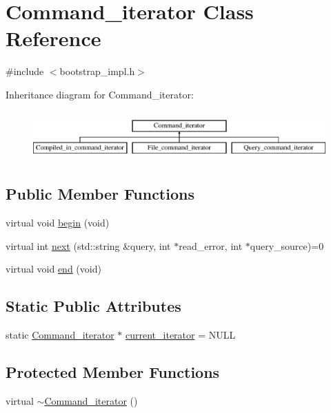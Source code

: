 \hypertarget{classCommand__iterator}{}\section{Command\+\_\+iterator Class Reference}
\label{classCommand__iterator}


{\ttfamily \#include $<$bootstrap\+\_\+impl.\+h$>$}

Inheritance diagram for Command\+\_\+iterator\+:\begin{figure}[H]
\begin{center}
\leavevmode
\includegraphics[height=1.904762cm]{classCommand__iterator}
\end{center}
\end{figure}
\subsection*{Public Member Functions}
\begin{DoxyCompactItemize}
\item 
virtual void \mbox{\hyperlink{classCommand__iterator_a4b17b4b7b81c4bb2a5109eb0d5ab1e3c}{begin}} (void)
\item 
virtual int \mbox{\hyperlink{classCommand__iterator_a582d0107e22598ec30aa7edcb8579f06}{next}} (std\+::string \&query, int $\ast$read\+\_\+error, int $\ast$query\+\_\+source)=0
\item 
virtual void \mbox{\hyperlink{classCommand__iterator_a564873043bc5c6e7f13916042ce320a3}{end}} (void)
\end{DoxyCompactItemize}
\subsection*{Static Public Attributes}
\begin{DoxyCompactItemize}
\item 
static \mbox{\hyperlink{classCommand__iterator}{Command\+\_\+iterator}} $\ast$ \mbox{\hyperlink{classCommand__iterator_adc037e2e49edfd3ab3b35639a0dfb3a9}{current\+\_\+iterator}} = N\+U\+LL
\end{DoxyCompactItemize}
\subsection*{Protected Member Functions}
\begin{DoxyCompactItemize}
\item 
virtual \mbox{\hyperlink{classCommand__iterator_a55b3b7b80a621e1c449aa659c70d6c71}{$\sim$\+Command\+\_\+iterator}} ()
\end{DoxyCompactItemize}


